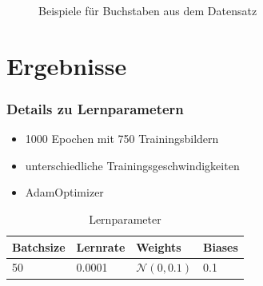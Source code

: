 \documentclass{beamer}
\begin{document}
\begin{frame}
\begin{figure}
		\caption{Beispiele für Buchstaben aus dem Datensatz}
		\label{fig:charexample}
	\end{figure}
\end{frame}

\section{Ergebnisse}
\begin{frame}
	\frametitle{Details zu Lernparametern}
	\begin{itemize} 		
		\item 1000 Epochen mit 750 Trainingsbildern
		\item unterschiedliche Trainingsgeschwindigkeiten
		\item AdamOptimizer
	\end{itemize}
	\begin{table}
		\begin{tabular}{l l l l}
			\toprule
			\textbf{Batchsize} & \textbf{Lernrate} & \textbf{Weights} & \textbf{Biases}\\
			\midrule
			50 &  0.0001 & \( \mathcal{N}(0,0.1) \) & 0.1\\
			
			\bottomrule
		\end{tabular}
		\caption{Lernparameter}
	\end{table}
\end{frame}
\end{document}
